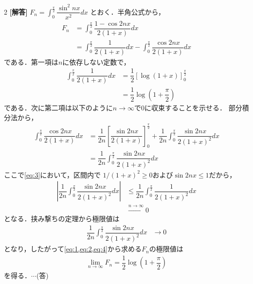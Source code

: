 \documentclass[../../main.tex]{subfiles}
\begin{document}
\setcounter{equation}{0}
\setcounter{figure}{0}
\setcounter{table}{0}
\begin{oframed}
  
\end{oframed}
\setlength{\columnseprule}{0.4pt}
\begin{multicols}{2}
  {\bf [解答]}
  $\displaystyle F_n = \int_0^{\frac{\pi}{2}} \dfrac{\sin^2 nx}{x^2} dx$ とおく．半角公式から，
  \begin{align}
    F_n
    & = \int_0^{\frac{\pi}{2}} \dfrac{1-\cos 2nx}{2(1+x)} dx \nonumber                                                      \\
    & = \int_0^{\frac{\pi}{2}} \dfrac{1}{2(1+x)} dx - \int_0^{\frac{\pi}{2}} \dfrac{\cos 2nx}{2(1+x)} dx \label{eq:1}
  \end{align}
  である．第一項は$n$に依存しない定数で，
  \begin{align}
    \int_0^{\frac{\pi}{2}} \dfrac{1}{2(1+x)} dx
    & = \dfrac{1}{2} \left[\log(1+x)\right]_0^{\frac{\pi}{2}} \nonumber   \\
    & = \dfrac{1}{2} \log\left(1+\dfrac{\pi}{2}\right) \label{eq:2}
  \end{align}
  である．次に第二項は以下のように$n\to\infty$で$0$に収束することを示せる．
  部分積分法から，
  \begin{align}
    \int_0^{\frac{\pi}{2}} \dfrac{\cos 2nx}{2(1+x)} dx
    & = \dfrac{1}{2n} \left[ \dfrac{\sin 2nx}{2(1+x)} \right]_0^{\frac{\pi}{2}} + \dfrac{1}{2n} \int_0^{\frac{\pi}{2}} \dfrac{\sin 2nx}{2(1+x)^2} dx \nonumber \\
    & =  \dfrac{1}{2n} \int_0^{\frac{\pi}{2}} \dfrac{\sin 2nx}{2(1+x)^2} dx \label{eq:3}
  \end{align}
  ここで\cref{eq:3}において，区間内で $1/(1+x)^2 \ge 0$および$\sin 2nx\le 1$だから，
  \begin{align}
    \left| \dfrac{1}{2n} \int_0^{\frac{\pi}{2}} \dfrac{\sin 2nx}{2(1+x)^2} dx \right|
    & \le \dfrac{1}{2n} \int_0^{\frac{\pi}{2}} \dfrac{1}{2(1+x)^2} dx \\
    & \xrightarrow{n \to \infty} 0
  \end{align}
  となる．挟み撃ちの定理から極限値は
  \begin{align}
    \dfrac{1}{2n} \int_0^{\frac{\pi}{2}} \dfrac{\sin 2nx}{2(1+x)^2} dx & \to 0 \label{eq:4}
  \end{align}
  となり，したがって\cref{eq:1,eq:2,eq:4}から求める$F_n$の極限値は
  \begin{align}
    \lim_{n\to\infty} F_n = \dfrac{1}{2} \log\left(1+\dfrac{\pi}{2}\right)
  \end{align}
  を得る．$\cdots$(答)


\end{multicols}
\end{document}
